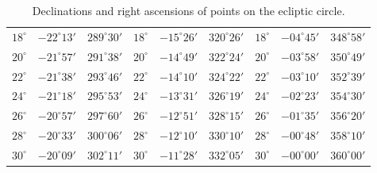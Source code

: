 \begin{table}[!h]
\begin{tabular}{ccc|ccc|ccc}
$18^\circ$ & $-22^\circ13'$ & $289^\circ30'$ & $18^\circ$ & $-15^\circ26'$ & $320^\circ26'$ & $18^\circ$ & $-04^\circ45'$ & $348^\circ58'$\\
$20^\circ$ & $-21^\circ57'$ & $291^\circ38'$ & $20^\circ$ & $-14^\circ49'$ & $322^\circ24'$ & $20^\circ$ & $-03^\circ58'$ & $350^\circ49'$\\
$22^\circ$ & $-21^\circ38'$ & $293^\circ46'$ & $22^\circ$ & $-14^\circ10'$ & $324^\circ22'$ & $22^\circ$ & $-03^\circ10'$ & $352^\circ39'$\\
$24^\circ$ & $-21^\circ18'$ & $295^\circ53'$ & $24^\circ$ & $-13^\circ31'$ & $326^\circ19'$ & $24^\circ$ & $-02^\circ23'$ & $354^\circ30'$\\
$26^\circ$ & $-20^\circ57'$ & $297^\circ60'$ & $26^\circ$ & $-12^\circ51'$ & $328^\circ15'$ & $26^\circ$ & $-01^\circ35'$ & $356^\circ20'$\\
$28^\circ$ & $-20^\circ33'$ & $300^\circ06'$ & $28^\circ$ & $-12^\circ10'$ & $330^\circ10'$ & $28^\circ$ & $-00^\circ48'$ & $358^\circ10'$\\
$30^\circ$ & $-20^\circ09'$ & $302^\circ11'$ & $30^\circ$ & $-11^\circ28'$ & $332^\circ05'$ & $30^\circ$ & $-00^\circ00'$ & $360^\circ00'$\\
\end{tabular}
\caption{Declinations and right ascensions of points on the ecliptic circle.}\label{tec2}
\end{table}

